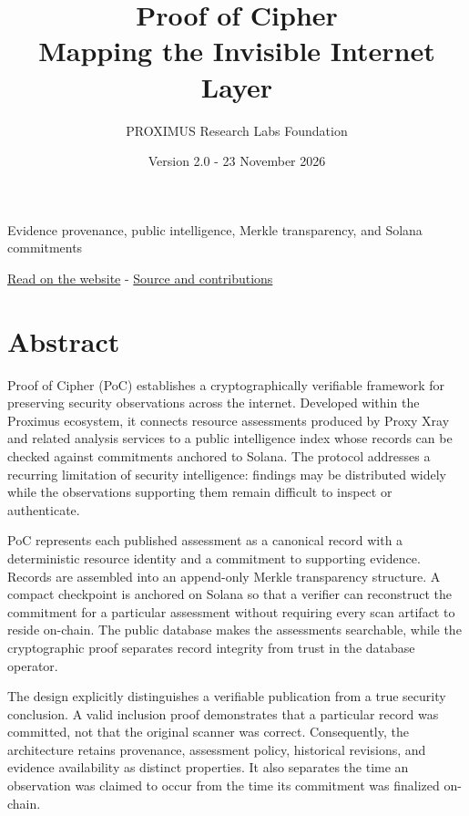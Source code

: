 \documentclass[10pt,a4paper]{article}
\begin{document}
\title{Proof of Cipher\\Mapping the Invisible Internet Layer}
\author{PROXIMUS Research Labs Foundation}
\date{Version 2.0 - 23 November 2026}
\maketitle
Evidence provenance, public intelligence, Merkle transparency, and Solana commitments

\href{https://www.proximus.sh/paper/proof-of-cipher}{Read on the website} - \href{https://github.com/PROXIMUS-RESEARCH-LABS-FOUNDATION/proof-of-cipher-paper}{Source and contributions}
\tableofcontents

\section*{Abstract}
Proof of Cipher (PoC) establishes a cryptographically verifiable framework for preserving security observations across the internet. Developed within the Proximus ecosystem, it connects resource assessments produced by Proxy Xray and related analysis services to a public intelligence index whose records can be checked against commitments anchored to Solana. The protocol addresses a recurring limitation of security intelligence: findings may be distributed widely while the observations supporting them remain difficult to inspect or authenticate.


PoC represents each published assessment as a canonical record with a deterministic resource identity and a commitment to supporting evidence. Records are assembled into an append-only Merkle transparency structure. A compact checkpoint is anchored on Solana so that a verifier can reconstruct the commitment for a particular assessment without requiring every scan artifact to reside on-chain. The public database makes the assessments searchable, while the cryptographic proof separates record integrity from trust in the database operator.


The design explicitly distinguishes a verifiable publication from a true security conclusion. A valid inclusion proof demonstrates that a particular record was committed, not that the original scanner was correct. Consequently, the architecture retains provenance, assessment policy, historical revisions, and evidence availability as distinct properties. It also separates the time an observation was claimed to occur from the time its commitment was finalized on-chain.
\end{document}
